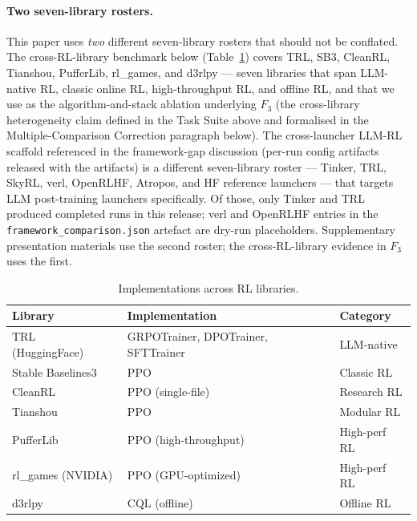 \paragraph{Two seven-library rosters.}
This paper uses \emph{two} different seven-library rosters that
should not be conflated. The cross-RL-library benchmark below
(Table~\ref{tab:implementations}) covers TRL, SB3, CleanRL, Tianshou,
PufferLib, rl\_games, and d3rlpy --- seven libraries that span
LLM-native RL, classic online RL, high-throughput RL, and offline RL,
and that we use as the algorithm-and-stack ablation underlying $F_3$ (the cross-library heterogeneity claim defined in the Task Suite above and formalised in the Multiple-Comparison Correction paragraph below).
The cross-launcher LLM-RL scaffold referenced in the framework-gap
discussion (per-run config artifacts released with the artifacts) is a different seven-library
roster --- Tinker, TRL, SkyRL, verl, OpenRLHF, Atropos, and HF
reference launchers --- that targets LLM post-training launchers
specifically. Of those, only Tinker and TRL produced completed
runs in this release; verl and OpenRLHF entries in the
\texttt{framework\_comparison.json} artefact are dry-run
placeholders. Supplementary presentation materials use the second roster; the
cross-RL-library evidence in $F_3$ uses the first.


\begin{table}[htbp]
\centering
\caption{Implementations across RL libraries.}
\label{tab:implementations}
\begin{tabular}{lll}
\toprule
\textbf{Library} & \textbf{Implementation} & \textbf{Category} \\
\midrule
TRL (HuggingFace)~\citep{vonwerra2022trl} & GRPOTrainer, DPOTrainer, SFTTrainer & LLM-native \\
Stable Baselines3~\citep{raffin2021sb3} & PPO & Classic RL \\
CleanRL~\citep{huang2022cleanrl} & PPO (single-file) & Research RL \\
Tianshou~\citep{weng2022tianshou} & PPO & Modular RL \\
PufferLib~\citep{suarez2024pufferlib} & PPO (high-throughput) & High-perf RL \\
rl\_games (NVIDIA) & PPO (GPU-optimized) & High-perf RL \\
d3rlpy~\citep{seno2022d3rlpy} & CQL (offline) & Offline RL \\
\bottomrule
\end{tabular}
\end{table}

